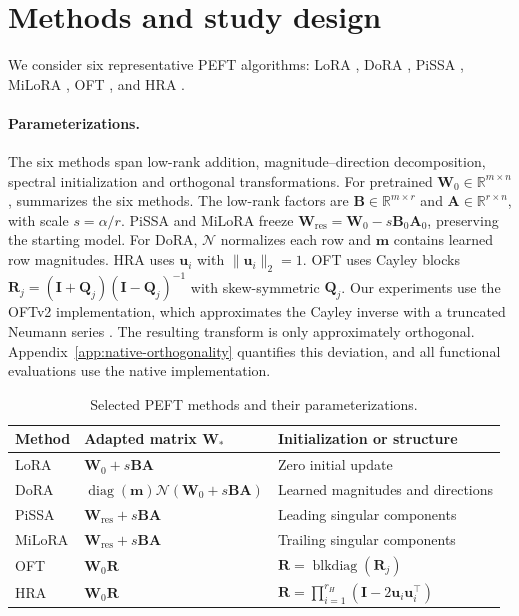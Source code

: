 \section{Methods and study design}\label{sec:protocol}

We consider six representative PEFT algorithms: LoRA \citep{hu2022lora}, DoRA \citep{liu2024dora}, PiSSA \citep{meng2024pissa}, MiLoRA \citep{wang2025milora}, OFT \citep{qiu2023oft}, and HRA \citep{yuan2024hra}.

\paragraph{Parameterizations.}
The six methods span low-rank addition, magnitude--direction decomposition, spectral initialization and orthogonal transformations.
For pretrained $\bm W_0\in\mathbb R^{m\times n}$,  summarizes the six methods. The low-rank factors are $\bm B\in\mathbb R^{m\times r}$ and $\bm A\in\mathbb R^{r\times n}$, with scale $s=\alpha/r$. PiSSA and MiLoRA freeze $\bm W_{\mathrm{res}}=\bm W_0-s\bm B_0\bm A_0$, preserving the starting model. For DoRA, $\mathcal N$ normalizes each row and $\bm m$ contains learned row magnitudes.
HRA uses $\bm u_i$ with $\|\bm u_i\|_2=1$.
OFT uses Cayley blocks $\bm R_j=(\bm I+\bm Q_j)(\bm I-\bm Q_j)^{-1}$ with skew-symmetric $\bm Q_j$.
Our experiments use the OFTv2 implementation, which approximates the Cayley inverse with a truncated Neumann series \citep{qiu2025oftv2}. The resulting transform is only approximately orthogonal. Appendix~\ref{app:native-orthogonality} quantifies this deviation, and all functional evaluations use the native implementation.

\begin{table}[!htbp]
\caption{Selected PEFT methods and their parameterizations.}
\label{tab:parameterizations}
\begin{center}
\begin{tabular}{@{}p{.12\linewidth}p{.39\linewidth}p{.43\linewidth}@{}}
\toprule
Method & Adapted matrix $\bm W_*$ & Initialization or structure \\
\midrule
\textcolor{LoRAColor}{LoRA} & $\bm W_0+s\bm B\bm A$ & Zero initial update \\
\textcolor{DoRAColor}{DoRA} & $\operatorname{diag}(\bm m)\mathcal N(\bm W_0+s\bm B\bm A)$ & Learned magnitudes and directions \\
\textcolor{PiSSAColor}{PiSSA} & $\bm W_{\mathrm{res}}+s\bm B\bm A$ & Leading singular components \\
\textcolor{MiLoRAColor}{MiLoRA} & $\bm W_{\mathrm{res}}+s\bm B\bm A$ & Trailing singular components \\
\textcolor{OFTColor}{OFT} & $\bm W_0\bm R$ & $\bm R=\operatorname{blkdiag}(\bm R_j)$ \\
\textcolor{HRAColor}{HRA} & $\bm W_0\bm R$ & $\bm R=\prod_{i=1}^{r_H}(\bm I-2\bm u_i\bm u_i^{\!\top})$ \\
\bottomrule
\end{tabular}
\end{center}
\end{table}

